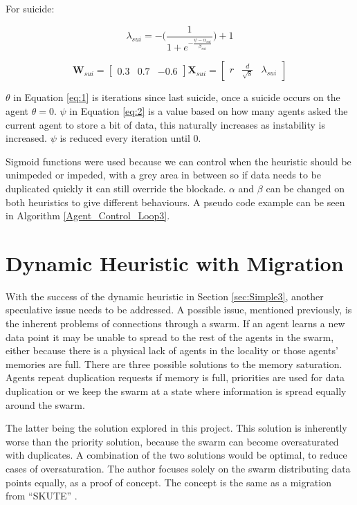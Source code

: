 \documentclass{UoYCSproject}
\begin{document}
For suicide:

\begin{equation}
\label{eq:2}
\lambda_{sui} = - \big( \frac{1}{1+ e^{- \frac{\psi - \alpha_{sui} }{ \beta_{sui} } } } \big) + 1
\end{equation}

\begin{equation}
\label{eq:101}
\textbf{W}_{sui} = \begin{bmatrix}0.3 & 0.7 & -0.6 \end{bmatrix}
\textbf{X}_{sui} = \begin{bmatrix} r & \frac{d}{\sqrt{8}} & \lambda_{sui} \end{bmatrix}
\end{equation}

$\theta$ in Equation \ref{eq:1} is iterations since last suicide, once a suicide occurs on the agent $\theta=0$.
$\psi$ in Equation \ref{eq:2} is a value based on how many agents asked the current agent to store a bit of data, this naturally increases as instability is increased.
$\psi$ is reduced every iteration until 0.

Sigmoid functions were used because we can control when the heuristic should be unimpeded or impeded, with a grey area in between so if data needs to be duplicated quickly it can still override the blockade.
$\alpha$ and $\beta$ can be changed on both heuristics to give different behaviours.
A pseudo code example can be seen in Algorithm \ref{Agent_Control_Loop3}.


\section{Dynamic Heuristic with Migration}
\label{sec:Simple4}

With the success of the dynamic heuristic in Section \ref{sec:Simple3}, another speculative issue needs to be addressed.
A possible issue, mentioned previously, is the inherent problems of connections through a swarm.
If an agent learns a new data point it may be unable to spread to the rest of the agents in the swarm, either because there is a physical lack of agents in the locality or those agents' memories are full.
There are three possible solutions to the memory saturation.
Agents repeat duplication requests if memory is full, priorities are used for data duplication or we keep the swarm at a state where information is spread equally around the swarm.

The latter being the solution explored in this project.
This solution is inherently worse than the priority solution, because the swarm can become oversaturated with duplicates.
A combination of the two solutions would be optimal, to reduce cases of oversaturation.
The author focuses solely on the swarm distributing data points equally, as a proof of concept.
The concept is the same as a migration from “SKUTE” \cite{Distributed Storage}.
\end{document}

